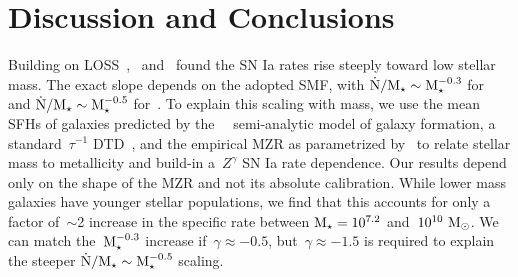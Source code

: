 \documentclass[foo.tex]{subfiles}
\begin{document}
\section{Discussion and Conclusions}
\label{sec:conclusions}

Building on LOSS~\citep{Li2011},~\citet{Brown2019} and~\citet{Wiseman2021}
found the SN Ia rates rise steeply toward low stellar mass.
The exact slope depends on the adopted SMF, with
$\dot{\text{N}} / \text{M}_\star \sim \text{M}_\star^{-0.3}$ for~\citet{Baldry2012} and
$\dot{\text{N}} / \text{M}_\star \sim \text{M}_\star^{-0.5}$ for~\citet{Bell2003}.
To explain this scaling with mass, we use the mean SFHs of galaxies predicted
by the~\um~\citep{Behroozi2019} semi-analytic model of galaxy formation, a
standard~$\tau^{-1}$ DTD~\citep[e.g.,][]{Maoz2012a}, and the empirical MZR as
parametrized by~\citet{Zahid2014} to relate stellar mass to metallicity and
build-in a~$Z^\gamma$ SN Ia rate dependence.
Our results depend only on the shape of the MZR and not its absolute
calibration.
While lower mass galaxies have younger stellar populations, we find that this
accounts for only a factor of~$\sim$2 increase in the specific rate between
$\text{M}_\star = 10^{7.2}$ and~$10^{10}~\text{M}_\odot$.
We can match the~$\text{M}_\star^{-0.3}$ increase if~$\gamma \approx -0.5$,
but~$\gamma \approx -1.5$ is required to explain the steeper
$\dot{\text{N}} / \text{M}_\star \sim \text{M}_\star^{-0.5}$ scaling.
\par
\end{document}
